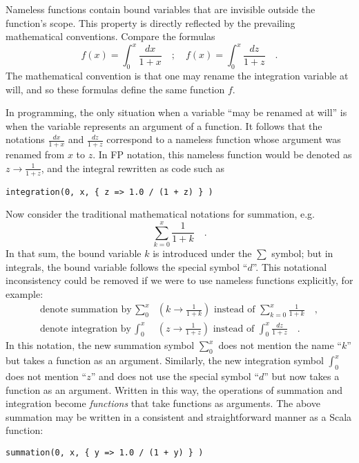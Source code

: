 Nameless functions contain bound variables that are invisible outside
the function\textsf{'}s scope. This property is directly reflected by the prevailing
mathematical conventions. Compare the formulas
\[
f\left(x\right)=\int_{0}^{x}\frac{dx}{1+x}\quad;\quad f\left(x\right)=\int_{0}^{x}\frac{dz}{1+z}\quad.
\]
The mathematical convention is that one may rename the integration
variable at will, and so these formulas define the same function $f$.

In programming, the only situation when a variable \textsf{``}may be renamed
at will\textsf{''} is when the variable represents an argument of a function.
It follows that the notations $\frac{dx}{1+x}$ and $\frac{dz}{1+z}$
correspond to a nameless function whose argument was renamed from
$x$ to $z$. In FP notation, this nameless function would be denoted
as $z\rightarrow\frac{1}{1+z}$, and the integral rewritten as code
such as
\begin{lstlisting}
integration(0, x, { z => 1.0 / (1 + z) } )
\end{lstlisting}
Now consider the traditional mathematical notations for summation,
e.g.
\[
\sum_{k=0}^{x}\frac{1}{1+k}\quad.
\]
In that sum, the bound variable $k$ is introduced under the $\sum$
symbol; but in integrals, the bound variable follows the special symbol
\textsf{``}$d$\textsf{''}. This notational inconsistency could be removed if we were
to use nameless functions explicitly, for example:
\begin{align*}
\text{denote summation by }\sum_{0}^{x} & \left(k\rightarrow\frac{1}{1+k}\right)\text{ instead of }\sum_{k=0}^{x}\frac{1}{1+k}\quad,\\
\text{denote integration by }\int_{0}^{x} & \left(z\rightarrow\frac{1}{1+z}\right)\text{ instead of }\int_{0}^{x}\frac{dz}{1+z}\quad.
\end{align*}
In this notation, the new summation symbol $\sum_{0}^{x}$ does not
mention the name \textsf{``}$k$\textsf{''} but takes a function as an argument. Similarly,
the new integration symbol $\int_{0}^{x}$ does not mention \textsf{``}$z$\textsf{''}
and does not use the special symbol \textsf{``}$d$\textsf{''} but now takes a function
as an argument. Written in this way, the operations of summation and
integration become \emph{functions} that take functions as arguments.
The above summation may be written in a consistent and straightforward
manner as a Scala function:
\begin{lstlisting}
summation(0, x, { y => 1.0 / (1 + y) } )
\end{lstlisting}

